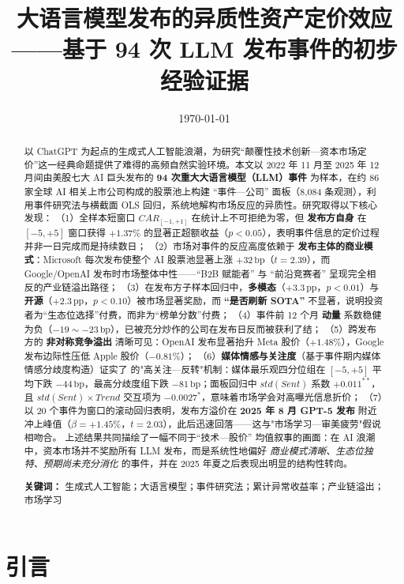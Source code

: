 \documentclass[11pt]{ctexart}
\title{\textbf{大语言模型发布的异质性资产定价效应}\\
\large ——基于 94 次 LLM 发布事件的初步经验证据}
\author{}
\date{\today}
\begin{document}
\maketitle

\begin{abstract}
\noindent 以 ChatGPT 为起点的生成式人工智能浪潮，为研究“颠覆性技术创新—资本市场定价”这一经典命题提供了难得的高频自然实验环境。本文以 2022 年 11 月至 2025 年 12 月间由美股七大 AI 巨头发布的 \textbf{94 次重大大语言模型（LLM）事件} 为样本，在约 86 家全球 AI 相关上市公司构成的股票池上构建 “事件—公司” 面板（8{,}084 条观测），利用事件研究法与横截面 OLS 回归，系统地解构市场反应的异质性。研究取得以下核心发现：
（1）全样本短窗口 $CAR_{[-1,+1]}$ 在统计上不可拒绝为零，但 \textbf{发布方自身} 在 $[-5,+5]$ 窗口获得 $+1.37\%$ 的显著正超额收益（$p<0.05$），表明事件信息的定价过程并非一日完成而是持续数日；
（2）市场对事件的反应高度依赖于 \textbf{发布主体的商业模式}：Microsoft 每次发布使整个 AI 股票池显著上涨 $+32\,\text{bp}$（$t=2.39$），而 Google/OpenAI 发布时市场整体中性——“B2B 赋能者” 与 “前沿竞赛者” 呈现完全相反的产业链溢出路径；
（3）在发布方子样本回归中，\textbf{多模态}（$+3.3\,\text{pp}$，$p<0.01$）与 \textbf{开源}（$+2.3\,\text{pp}$，$p<0.10$）被市场显著奖励，而 \textbf{“是否刷新 SOTA”} 不显著，说明投资者为“生态位选择”付费，而非为“榜单分数”付费；
（4）事件前 12 个月 \textbf{动量} 系数稳健为负（$-19\sim-23\,\text{bp}$），已被充分炒作的公司在发布日反而被获利了结；
（5）跨发布方的 \textbf{非对称竞争溢出} 清晰可见：OpenAI 发布显著抬升 Meta 股价（$+1.48\%$），Google 发布边际性压低 Apple 股价（$-0.81\%$）；
（6）\textbf{媒体情感与关注度}（基于事件期内媒体情感分歧度构造）证实了 \cite{DaEngelbergGao2011} 的"高关注—反转"机制：媒体最乐观四分位组在 $[-5,+5]$ 平均下跌 $-44\,\text{bp}$，最高分歧度组下跌 $-81\,\text{bp}$；面板回归中 $std(Sent)$ 系数 $+0.011^{**}$，且 $std(Sent)\times Trend$ 交互项为 $-0.0027^{*}$，意味着市场学会对高曝光信息折价；
（7）以 20 个事件为窗口的滚动回归表明，发布方溢价在 \textbf{2025 年 8 月 GPT-5 发布} 附近冲上峰值（$\beta=+1.45\%$，$t=2.03$），此后迅速回落——这与"市场学习—审美疲劳"假说相吻合。
上述结果共同描绘了一幅不同于“技术—股价” 均值叙事的画面：在 AI 浪潮中，资本市场并不奖励所有 LLM 发布，而是系统性地偏好 \emph{商业模式清晰、生态位独特、预期尚未充分消化} 的事件，并在 2025 年夏之后表现出明显的结构性转向。

\smallskip
\noindent\textbf{关键词：} 生成式人工智能；大语言模型；事件研究法；累计异常收益率；产业链溢出；市场学习
\end{abstract}

\section{引言}
\end{document}
